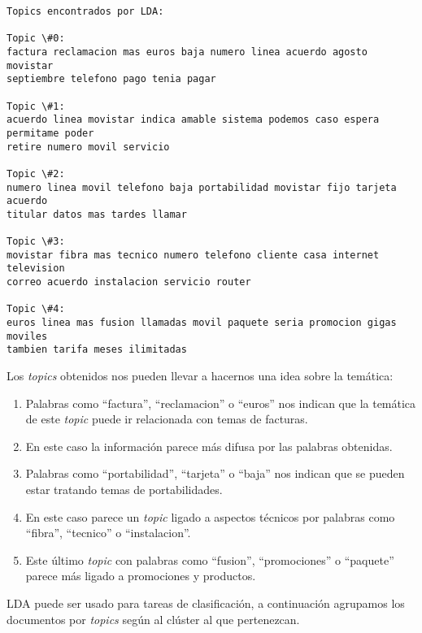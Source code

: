     \begin{Verbatim}[commandchars=\\\{\}]
Topics encontrados por LDA:

Topic \#0:
factura reclamacion mas euros baja numero linea acuerdo agosto movistar
septiembre telefono pago tenia pagar

Topic \#1:
acuerdo linea movistar indica amable sistema podemos caso espera permitame poder
retire numero movil servicio

Topic \#2:
numero linea movil telefono baja portabilidad movistar fijo tarjeta acuerdo
titular datos mas tardes llamar

Topic \#3:
movistar fibra mas tecnico numero telefono cliente casa internet television
correo acuerdo instalacion servicio router

Topic \#4:
euros linea mas fusion llamadas movil paquete seria promocion gigas moviles
tambien tarifa meses ilimitadas
    \end{Verbatim}


Los \textit{topics} obtenidos nos pueden llevar a hacernos una idea sobre la temática:

\begin{enumerate}
\item Palabras como ``factura'', ``reclamacion'' o ``euros'' nos indican que la temática de este \textit{topic} puede ir relacionada con temas de facturas.
\item En este caso la información parece más difusa por las palabras obtenidas.
\item Palabras como ``portabilidad'', ``tarjeta'' o ``baja'' nos indican que se pueden estar tratando temas de portabilidades. 
\item En este caso parece un \textit{topic} ligado a aspectos técnicos por palabras como ``fibra'', ``tecnico'' o ``instalacion''.
\item Este último \textit{topic} con palabras como ``fusion'', ``promociones'' o ``paquete'' parece más ligado a promociones y productos. 
\end{enumerate}

LDA puede ser usado para tareas de clasificación, a continuación agrupamos los documentos por \textit{topics} según al clúster al que pertenezcan. 


